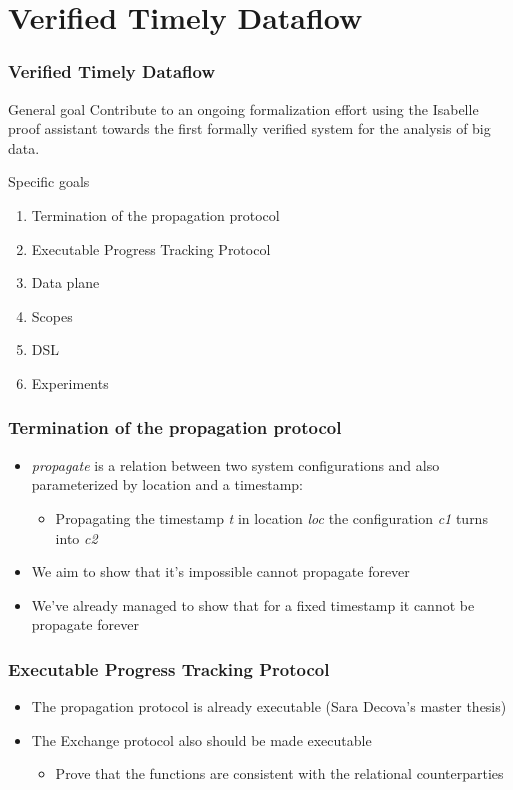 \documentclass[aspectratio=169,10pt]{beamer}
\begin{document}
\section{Verified Timely Dataflow}

\begin{frame}
  \frametitle{Verified Timely Dataflow}
  \begin{block}{General goal}
    Contribute to an ongoing formalization effort using the Isabelle proof assistant towards the first formally verified system for the analysis of big data.
  \end{block}
  \pause
  \begin{block}{Specific goals}
    \begin{enumerate}
      \item Termination of the propagation protocol
      \item Executable Progress Tracking Protocol
      \item Data plane
      \item Scopes
      \item DSL
      \item Experiments
    \end{enumerate}
  \end{block}
\end{frame}

\begin{frame}
  \frametitle{Termination of the propagation protocol}
  \begin{itemize}
    \item \textit{propagate} is a relation between two system configurations and also parameterized by location and a timestamp:
          \begin{itemize}
            \item Propagating the timestamp \textit{t} in location \textit{loc} the configuration \textit{c1} turns into \textit{c2}
          \end{itemize}
    \item We aim to show that it's impossible cannot propagate forever
    \item We've already managed to show that for a fixed timestamp it cannot be propagate forever
  \end{itemize}
\end{frame}

\begin{frame}
  \frametitle{Executable Progress Tracking Protocol}
  \begin{itemize}
    \item The propagation protocol is already executable (Sara Decova's master thesis)
    \item The Exchange protocol also should be made executable
          \begin{itemize}
            \item Prove that the functions are consistent with the relational counterparties
          \end{itemize}
  \end{itemize}
\end{frame}
\end{document}
